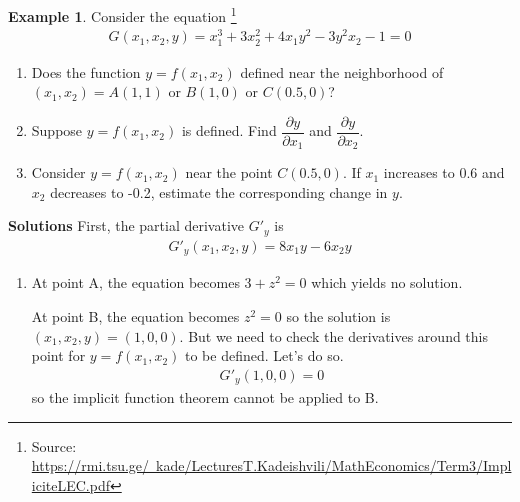 \documentclass[10pt,a4paper]{book}
\theoremstyle{definition}\newtheorem{definition}{Definition}
\theoremstyle{definition}\newtheorem{fact}{Fact}
\theoremstyle{definition}\newtheorem{ex}{Ex.}
\theoremstyle{definition}\newtheorem{project}{Project}
\theoremstyle{definition}\newtheorem{problem}{Problem}
\theoremstyle{definition}\newtheorem{example}{Example}
\numberwithin{theorem}{chapter}
\numberwithin{corollary}{chapter}
\numberwithin{assumption}{chapter}
\numberwithin{definition}{chapter}
\numberwithin{prop}{chapter}
\numberwithin{notation}{chapter}
\numberwithin{problem}{chapter}
\numberwithin{example}{chapter}
\numberwithin{fact}{chapter}
\numberwithin{ex}{chapter}
\begin{document}
	\begin{example}
		Consider the equation \footnote{Source: \href{https://rmi.tsu.ge/~kade/LecturesT.Kadeishvili/MathEconomics/Term3/ImpliciteLEC.pdf}{https://rmi.tsu.ge/~kade/LecturesT.Kadeishvili/MathEconomics/Term3/ImpliciteLEC.pdf}}
		\begin{align*}
			G(x_1, x_2, y) = x_1^3 + 3 x_2^2 + 4 x_1 y^2 - 3y^2 x_2 - 1 = 0
		\end{align*}
		\begin{enumerate}
			\item Does the function $y = f(x_1, x_2)$ defined near the neighborhood of $(x_1, x_2) = A(1,1)$ or $B (1,0)$ or $C(0.5, 0)$?
			\item Suppose $y = f(x_1, x_2)$ is defined. Find $\dfrac{\partial y}{\partial x_1}$ and $\dfrac{\partial y}{\partial x_2}$.
			\item Consider $y = f(x_1, x_2)$ near the point $C(0.5, 0)$. If $x_1$ increases to 0.6 and $x_2$ decreases to -0.2, estimate the corresponding change in $y$.
		\end{enumerate}
		\textbf{Solutions}
		First, the partial derivative $G'_y$ is
		\begin{align*}
			G'_y (x_1, x_2, y) = 8x_1 y - 6 x_2 y
		\end{align*} 
		\begin{enumerate}
			\item At point A, the equation becomes $3 + z^2 = 0$ which yields no solution. 
			
			At point B, the equation becomes $z^2 = 0$ so the solution is $(x_1, x_2, y) = (1,0,0)$. But we need to check the derivatives around this point for $y=f(x_1,x_2)$ to be defined. Let's do so.
			\begin{align*}
				G'_y (1,0,0) = 0
			\end{align*}
			so the implicit function theorem cannot be applied to B. 
			

\end{enumerate}
\end{example}
\end{document}
